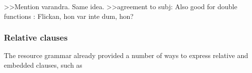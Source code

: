 \documentclass{report}
\begin{document}
>>Mention varandra. Same idea.
>>agreement to subj: Also good for double functions : Flickan, hon var inte dum, hon?




\subsubsection{Relative clauses}
The resource grammar already provided a number of ways to express relative and embedded clauses, such as
\end{document}
